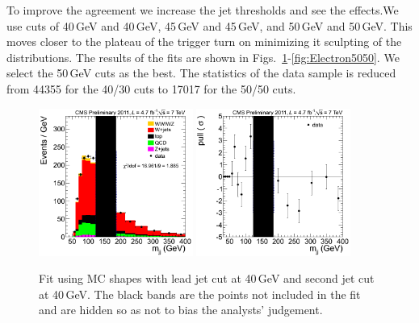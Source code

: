 To improve the agreement we increase the jet \pt thresholds and see
the effects.We use cuts of 40\,GeV and 40\,GeV, 45\,GeV and 45\,GeV,
and 50\,GeV and 50\,GeV.  This moves closer to the plateau of the
trigger turn on minimizing it sculpting of the distributions.  The
results of the fits are shown in
Figs.~\ref{fig:Electron4040}-\ref{fig:Electron5050}.  We select the
50\,GeV \pt cuts as the best.  The statistics of the data sample is
reduced from 44355 for the 40/30 cuts to 17017 for the 50/50 cuts.

\begin{figure}
\begin{center}
  \includegraphics[width=0.45\textwidth]{figs/ElectronCuts/hist40_Wjj_Mjj_Electron_2jets_Stacked.png}
  \includegraphics[width=0.45\textwidth]{figs/ElectronCuts/hist40_Wjj_Mjj_Electron_2jets_Pull.png}
\end{center}
\caption{\label{fig:Electron4040}Fit using MC shapes with lead jet cut
at 40\,GeV and second jet cut at 40\,GeV.  The black bands are the
points not included in the fit and are hidden so as not to bias the
analysts' judgement.}
\end {figure}

